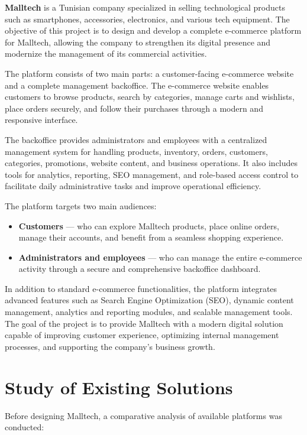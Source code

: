 \textbf{Malltech} is a Tunisian company specialized in selling technological products such as smartphones, accessories, electronics, and various tech equipment. The objective of this project is to design and develop a complete e-commerce platform for Malltech, allowing the company to strengthen its digital presence and modernize the management of its commercial activities.

The platform consists of two main parts: a customer-facing e-commerce website and a complete management backoffice. The e-commerce website enables customers to browse products, search by categories, manage carts and wishlists, place orders securely, and follow their purchases through a modern and responsive interface.

The backoffice provides administrators and employees with a centralized management system for handling products, inventory, orders, customers, categories, promotions, website content, and business operations. It also includes tools for analytics, reporting, SEO management, and role-based access control to facilitate daily administrative tasks and improve operational efficiency.

The platform targets two main audiences:

\begin{itemize}
    \item \textbf{Customers} — who can explore Malltech products, place online orders, manage their accounts, and benefit from a seamless shopping experience.

    \item \textbf{Administrators and employees} — who can manage the entire e-commerce activity through a secure and comprehensive backoffice dashboard.
\end{itemize}

In addition to standard e-commerce functionalities, the platform integrates advanced features such as Search Engine Optimization (SEO), dynamic content management, analytics and reporting modules, and scalable management tools. The goal of the project is to provide Malltech with a modern digital solution capable of improving customer experience, optimizing internal management processes, and supporting the company's business growth.

\section{Study of Existing Solutions}

Before designing Malltech, a comparative analysis of available platforms was conducted:

